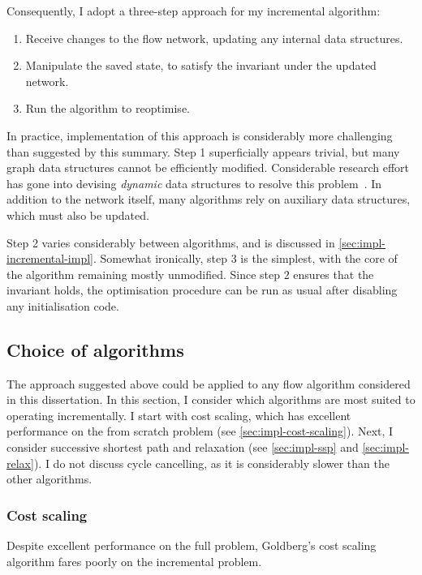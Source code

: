 Consequently, I adopt a three-step approach for my incremental algorithm:

\begin{enumerate}
    \item Receive changes to the flow network, updating any internal data structures.
    \item Manipulate the saved state, to satisfy the invariant under the updated network.
    \item Run the algorithm to reoptimise.
\end{enumerate}

In practice, implementation of this approach is considerably more challenging than suggested by this summary. Step 1 superficially appears trivial, but many graph data structures cannot be efficiently modified. Considerable research effort has gone into devising \emph{dynamic} data structures to resolve this problem~\cite{Tarjan:1983,Eppstein:1996}. In addition to the network itself, many algorithms rely on auxiliary data structures\footnotemark, which must also be updated.

Step 2 varies considerably between algorithms, and is discussed in \cref{sec:impl-incremental-impl}. Somewhat ironically, step 3 is the simplest, with the core of the algorithm remaining mostly unmodified. Since step 2 ensures that the invariant holds, the optimisation procedure can be run as usual after disabling any initialisation code.

\subsection{Choice of algorithms} \label{sec:impl-incremental-choice}
The approach suggested above could be applied to any flow algorithm considered in this dissertation. In this section, I consider which algorithms are most suited to operating incrementally. I start with cost scaling, which has excellent performance on the from scratch problem (see \cref{sec:impl-cost-scaling}). Next, I consider successive shortest path and relaxation (see \cref{sec:impl-ssp} and \cref{sec:impl-relax}). I do not discuss cycle cancelling, as it is considerably slower than the other algorithms.

\subsubsection{Cost scaling} 
Despite excellent performance on the full problem, Goldberg's cost scaling algorithm fares poorly on the incremental problem. 

